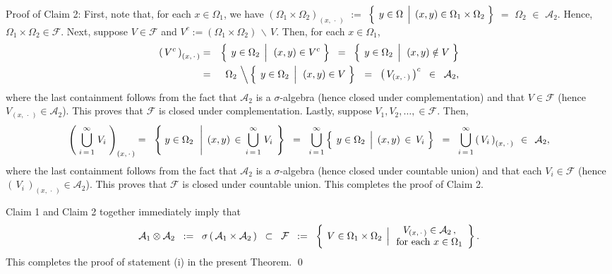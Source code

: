 \vskip 0.5cm
\noindent
Proof of Claim 2:\quad
First, note that, for each $x \in \Omega_{1}$, we have
$(\Omega_{1}\times\Omega_{2})_{(x,\,\cdot\,)}$ $:=$
$\left\{\;\left. y\overset{{\color{white}.}}{\in}\Omega \;\,\right\vert\; (x,y)\in\Omega_{1}\times\Omega_{2}\;\right\}$
$=$ $\Omega_{2}$ $\in$ $\mathcal{A}_{2}$.
Hence, $\Omega_{1}\times\Omega_{2} \in \mathcal{F}$.
Next, suppose $V \in \mathcal{F}$ and $V^{c} := (\Omega_{1}\times\Omega_{2})\,\backslash\,V$.
Then, for each $x \in \Omega_{1}$,
\begin{eqnarray*}
\left(\,V^{c}\,\right)_{(x,\,\cdot\,)}
& = &
	\left\{\;\left.
	y \overset{{\color{white}.}}{\in} \Omega_{2}
	\,\;\right\vert\,\;
	(x,y) \in V^{c}
	\;\right\}
\;\; = \;\;
	\left\{\;\left.
	y \overset{{\color{white}.}}{\in} \Omega_{2}
	\,\;\right\vert\,\;
	(x,y) \notin V
	\;\right\}
\\
& = &
	\Omega_{2}
	\,\left\backslash\,
	\left\{\;\left.
	y \overset{{\color{white}.}}{\in} \Omega_{2}
	\,\;\right\vert\,\;
	(x,y) \in V
	\;\right\}
	\right.
\;\; = \;\;
	\left(\,V_{(x,\,\cdot\,)}\,\right)^{c}
\;\; \in \;\; \mathcal{A}_{2},
\end{eqnarray*}
where the last containment follows from the fact that $\mathcal{A}_{2}$ is a $\sigma$-algebra (hence closed under complementation) and that $V \in \mathcal{F}$ (hence $V_{(x,\,\cdot\,)} \in \mathcal{A}_{2}$). This proves that $\mathcal{F}$ is closed under complementation. Lastly, suppose $V_{1}, V_{2}, \ldots, \in \mathcal{F}$. Then,
\begin{eqnarray*}
\left(\;\overset{\infty}{\underset{i\,=\,1}{\bigcup}}\;V_{i}\;\right)_{(x,\,\cdot\,)}
=\;\;
	\left\{\;
	y \overset{{\color{white}.}}{\in} \Omega_{2}
	\,\;\left\vert\,\;
	(x,y) \,\in\, \overset{\infty}{\underset{i\,=\,1}{\bigcup}}\;V_{i}
	\right.
	\;\right\}
\;\; = \;\;
	\overset{\infty}{\underset{i\,=\,1}{\bigcup}}
	\left\{\;\left.
	y \overset{{\color{white}.}}{\in} \Omega_{2}
	\,\;\right\vert\;
	(x,y) \,\in\, V_{i}
	\;\right\}
\;\; = \;\;
	\overset{\infty}{\underset{i\,=\,1}{\bigcup}}
	\left(\,V_{i}\,\right)_{(x,\,\cdot\,)}
\;\, \in \;\, \mathcal{A}_{2},
\end{eqnarray*}
where the last containment follows from the fact that $\mathcal{A}_{2}$ is a $\sigma$-algebra (hence closed under countable union) and that each $V_{i} \in \mathcal{F}$ (hence $\left(\,V_{i}\,\right)_{(x,\,\cdot\,)} \in \mathcal{A}_{2}$).
This proves that $\mathcal{F}$ is closed under countable union. This completes the proof of Claim 2.

\vskip 0.5cm
\noindent
Claim 1 and Claim 2 together immediately imply that
\begin{equation*}
\mathcal{A}_{1} \otimes \mathcal{A}_{2}
\;\; := \;\;
	\sigma\left(\,\mathcal{A}_{1}\times\mathcal{A}_{2}\,\right)
\;\;\subset\;\;
	\mathcal{F}
\;\; := \;\;
	\left\{\;\left.
	V \overset{{\color{white}.}}{\in} \Omega_{1}\times\Omega_{2}
	\,\;\right\vert
	\begin{array}{c} V_{(x,\,\cdot\,)} \in \mathcal{A}_{2}\,,\\ \textnormal{for each $x\in\Omega_{1}$} \end{array}
	\right\}.
\end{equation*}
This completes the proof of statement (i) in the present Theorem.
\qed

